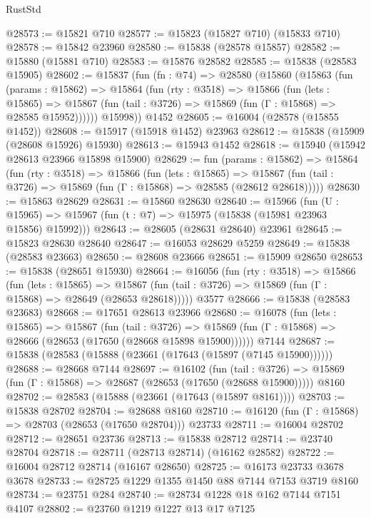 \begin{lexlean}{RustStd}
\begin{coremodule}
@28573 := @15821 @710
@28577 := @15823 (@15827 @710) (@15833 @710)
@28578 := @15842 @23960
@28580 := @15838 (@28578 @15857)
@28582 := @15880 (@15881 @710)
@28583 := @15876 @28582
@28585 := @15838 (@28583 @15905)
@28602 := @15837
    (fun (fn : @74) =>
    @28580
      (@15860
        (@15863
          (fun (params : @15862) =>
          @15864
            (fun (rty : @3518) =>
            @15866
              (fun (lets : @15865) =>
              @15867 (fun (tail : @3726) => @15869 (fun (Γ : @15868) => @28585 @15952))))))
        @15998))
    @1452
@28605 := @16004 (@28578 (@15855 @1452))
@28608 := @15917 (@15918 @1452) @23963
@28612 := @15838 (@15909 (@28608 @15926) @15930)
@28613 := @15943 @1452
@28618 := @15940 (@15942 @28613 @23966 @15898 @15900)
@28629 := fun (params : @15862) =>
  @15864
    (fun (rty : @3518) =>
    @15866
      (fun (lets : @15865) =>
      @15867 (fun (tail : @3726) => @15869 (fun (Γ : @15868) => @28585 (@28612 @28618)))))
@28630 := @15863 @28629
@28631 := @15860 @28630
@28640 := @15966
    (fun (U : @15965) => @15967 (fun (t : @7) => @15975 (@15838 (@15981 @23963 @15856) @15992)))
@28643 := @28605 (@28631 @28640) @23961
@28645 := @15823 @28630 @28640
@28647 := @16053 @28629 @5259
@28649 := @15838 (@28583 @23663)
@28650 := @28608 @23666
@28651 := @15909 @28650
@28653 := @15838 (@28651 @15930)
@28664 := @16056
    (fun (rty : @3518) =>
    @15866
      (fun (lets : @15865) =>
      @15867 (fun (tail : @3726) => @15869 (fun (Γ : @15868) => @28649 (@28653 @28618)))))
    @3577
@28666 := @15838 (@28583 @23683)
@28668 := @17651 @28613 @23966
@28680 := @16078
    (fun (lets : @15865) =>
    @15867
      (fun (tail : @3726) =>
      @15869 (fun (Γ : @15868) => @28666 (@28653 (@17650 (@28668 @15898 @15900))))))
    @7144
@28687 := @15838 (@28583 (@15888 (@23661 (@17643 (@15897 (@7145 @15900))))))
@28688 := @28668 @7144
@28697 := @16102
    (fun (tail : @3726) => @15869 (fun (Γ : @15868) => @28687 (@28653 (@17650 (@28688 @15900)))))
    @8160
@28702 := @28583 (@15888 (@23661 (@17643 (@15897 @8161))))
@28703 := @15838 @28702
@28704 := @28688 @8160
@28710 := @16120 (fun (Γ : @15868) => @28703 (@28653 (@17650 @28704))) @23733
@28711 := @16004 @28702
@28712 := @28651 @23736
@28713 := @15838 @28712
@28714 := @23740 @28704
@28718 := @28711 (@28713 @28714) (@16162 @28582)
@28722 := @16004 @28712 @28714 (@16167 @28650)
@28725 := @16173 @23733 @3678 @3678
@28733 := @28725 @1229 @1355 @1450 @88 @7144 @7153 @3719 @8160
@28734 := @23751 @284
@28740 := @28734 @1228 @18 @162 @7144 @7151 @4107
@28802 := @23760
    @1219
    @1227
    @13
    @17
    @7125

\end{coremodule}
\end{lexlean}
